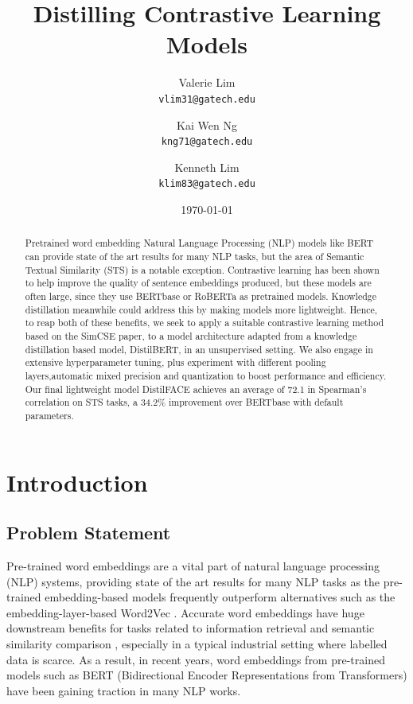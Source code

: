\documentclass[10pt,twocolumn,letterpaper]{article}
\title{Distilling Contrastive Learning Models}
\author{
Valerie Lim \\ {\tt\small vlim31@gatech.edu}
\and
Kai Wen Ng \\ {\tt\small kng71@gatech.edu}
\and
Kenneth Lim \\ {\tt\small klim83@gatech.edu}
\date{\today}
}
\begin{document}
\maketitle

\begin{abstract}
    Pretrained word embedding Natural Language Processing (NLP) models like BERT can provide state of the art results for many NLP tasks, but the area of Semantic Textual Similarity (STS) is a notable exception. Contrastive learning has been shown to help improve the quality of sentence embeddings produced, but these models are often large, since they use BERTbase or RoBERTa as pretrained models. Knowledge distillation meanwhile could address this by making models more lightweight. Hence, to reap both of these benefits, we seek to apply a suitable contrastive learning method based on the SimCSE paper, to a model architecture adapted from a knowledge distillation based model, DistilBERT, in an unsupervised setting. We also engage in extensive hyperparameter tuning, plus experiment with different pooling layers,automatic mixed precision and quantization to boost performance and efficiency. Our final lightweight model DistilFACE achieves an average of 72.1 in Spearman’s correlation on STS tasks, a 34.2\% improvement over BERTbase with default parameters.
\end{abstract}


\section{Introduction}

\subsection{Problem Statement}

Pre-trained word embeddings are a vital part of natural language processing (NLP) systems, providing state of the art results for many NLP tasks  as the pre-trained embedding-based models frequently outperform alternatives such as the embedding-layer-based Word2Vec \cite{farahmand}. Accurate word embeddings have huge downstream benefits for tasks related to information retrieval and semantic similarity comparison \cite{2105.11741}, especially in a typical industrial setting where labelled data is scarce. As a result, in recent years, word embeddings from pre-trained models such as BERT (Bidirectional Encoder Representations from Transformers) have been gaining traction in many NLP works.
\end{document}
